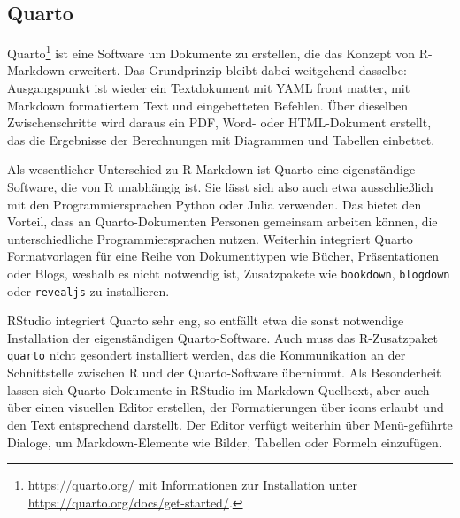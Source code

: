 
\subsection{Quarto}
\label{sec:quarto}


Quarto\footnote{\url{https://quarto.org/} mit Informationen zur Installation unter \url{https://quarto.org/docs/get-started/}.} ist eine Software um Dokumente zu erstellen, die das Konzept von R-Markdown erweitert. Das Grundprinzip bleibt dabei weitgehend dasselbe: Ausgangspunkt ist wieder ein Textdokument mit YAML front matter,  mit Markdown formatiertem Text und eingebetteten Befehlen. Über dieselben Zwischenschritte wird daraus ein PDF, Word- oder HTML-Dokument erstellt, das die Ergebnisse der Berechnungen mit Diagrammen und Tabellen einbettet.

Als wesentlicher Unterschied zu R-Markdown ist Quarto eine eigenständige Software, die von R unabhängig ist. Sie lässt sich also auch etwa ausschließlich mit den Programmiersprachen Python oder Julia verwenden. Das bietet den Vorteil, dass an Quarto-Dokumenten Personen gemeinsam arbeiten können, die unterschiedliche Programmiersprachen nutzen. Weiterhin integriert Quarto Formatvorlagen für eine Reihe von Dokumenttypen wie Bücher, Präsentationen oder Blogs, weshalb es nicht notwendig ist, Zusatzpakete wie \lstinline!bookdown!, \lstinline!blogdown! oder \lstinline!revealjs! zu installieren.

RStudio integriert Quarto sehr eng, so entfällt etwa die sonst notwendige Installation der eigenständigen Quarto-Software. Auch muss das R-Zusatzpaket  \lstinline!quarto! \cite{Allaire2024} nicht gesondert installiert werden, das die Kommunikation an der Schnittstelle zwischen R und der Quarto-Software übernimmt. Als Besonderheit lassen sich Quarto-Dokumente in RStudio im Markdown Quelltext, aber auch über einen visuellen Editor erstellen, der Formatierungen über icons erlaubt und den Text entsprechend darstellt. Der Editor verfügt weiterhin über Menü-geführte Dialoge, um Markdown-Elemente wie Bilder, Tabellen oder Formeln einzufügen.

